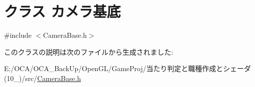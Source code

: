 \hypertarget{class_xE3_x82_xAB_xE3_x83_xA1_xE3_x83_xA9_xE5_x9F_xBA_xE5_xBA_x95}{\section{クラス カメラ基底}
\label{class_xE3_x82_xAB_xE3_x83_xA1_xE3_x83_xA9_xE5_x9F_xBA_xE5_xBA_x95}
}


{\ttfamily \#include $<$Camera\-Base.\-h$>$}



このクラスの説明は次のファイルから生成されました\-:\begin{DoxyCompactItemize}
\item 
E\-:/\-O\-C\-A/\-O\-C\-A\-\_\-\-Back\-Up/\-Open\-G\-L/\-Game\-Proj/当たり判定と職種作成とシェーダ(10\-\_)/src/\hyperlink{_camera_base_8h}{Camera\-Base.\-h}\end{DoxyCompactItemize}
